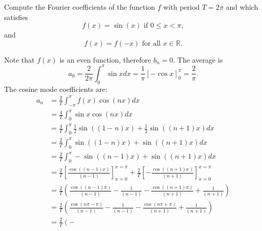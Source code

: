 \documentclass[11pt]{article}
\begin{document}
\begin{exercise}
     Compute the Fourier coefficients of the function $f$ with period $T = 2\pi$ and which satisfies 
     \[
        f(x) = \sin(x) \text{ if } 0 \leq x  < \pi,
     \]
     and 
     \[
        f(x) = f(-x) \text{ for all } x \in \mathbb R.
     \]
\end{exercise}
\begin{solution}     
    Note that $f(x)$ is an even function,
    therefore $b_n = 0$. 
    The average is 
	\[
        a_0 = \frac{2}{2\pi} \int_{0}^{\pi} \sin x dx  =  \frac{1}{\pi}\left[ - \cos{x} \right]_{0}^{\pi} =\frac{2}{\pi} .
    \]
    The cosine mode coefficients are:
    \begin{align*}
            a_n 
            &
            = 
            \frac{2}{T}
            \int_{-\pi}^{\pi} f(x)   \cos(n x) dx
            \\&
            = 
            \frac{4}{T}
            \int_{0}^{\pi} \sin x \cos(n x) dx
            \\&
            =
            \frac{4}{T}
            \int_{0}^{\pi} \frac 1 2 \sin((1-n)x) + \frac 1 2 \sin((n+1)x) dx
            \\&
            =
            \frac{2}{T}
            \int_{0}^{\pi} \sin((1-n)x) + \sin((n+1)x) dx
            \\&
            =
            \frac{2}{T}
            \int_{0}^{\pi} -\sin((n-1)x) + \sin((n+1)x) dx
            \\&
            =
            \frac{2}{T}
            \left[\frac{ \cos((n-1)x) }{ (n-1) } \right]_{x=0}^{x=\pi}
            +
            \frac{2}{T}
            \left[- \frac{ \cos((n+1)x) }{ (n+1) } \right]_{x=0}^{x=\pi}
            \\&
            = 
            \frac 2 T 
            \left( 
                \frac{ \cos((n-1)\pi) }{(n-1)} 
                - 
                \frac{1}{(n-1)}
                -
                \frac{ \cos((n+1)\pi) }{(n+1)} 
                + 
                \frac{1}{(n+1)}
            \right)
            \\&
            = 
            \frac 2 T 
            \left( 
                \frac{ \cos( n \pi - \pi ) }{(n-1)} 
                - 
                \frac{1}{(n-1)}
                -
                \frac{ \cos( n \pi + \pi ) }{(n+1)} 
                + 
                \frac{1}{(n+1)}
            \right)
            \\&
            = 
            \frac 2 T 
            \left( 
                -

\end{align*}
\end{solution}
\end{document}
